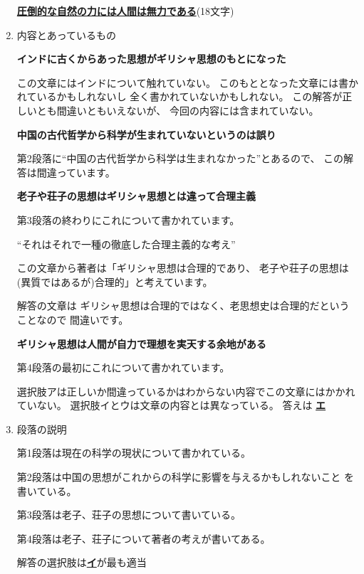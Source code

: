 \documentclass[10pt,b5paper]{ltjsarticle}
\begin{document}
\begin{enumerate}
       \underline{\textbf{圧倒的な自然の力には人間は無力である}}(18文字)

 \item 内容とあっているもの

       \textbf{インドに古くからあった思想がギリシャ思想のもとになった}

       この文章にはインドについて触れていない。
       このもととなった文章には書かれているかもしれないし
       全く書かれていないかもしれない。
       この解答が正しいとも間違いともいえないが、
       今回の内容には含まれていない。

       \textbf{中国の古代哲学から科学が生まれていないというのは誤り}

       第2段落に``中国の古代哲学から科学は生まれなかった''とあるので、
       この解答は間違っています。

       \textbf{老子や荘子の思想はギリシャ思想とは違って合理主義}

       第3段落の終わりにこれについて書かれています。

       ``それはそれで一種の徹底した合理主義的な考え''

       この文章から著者は「ギリシャ思想は合理的であり、
       老子や荘子の思想は(異質ではあるが)合理的」と考えています。

       解答の文章は
       ギリシャ思想は合理的ではなく、老思想史は合理的だということなので
       間違いです。

       \textbf{ギリシャ思想は人間が自力で理想を実天する余地がある}

       第4段落の最初にこれについて書かれています。

       選択肢アは正しいか間違っているかはわからない内容でこの文章にはかかれていない。
       選択肢イとウは文章の内容とは異なっている。
       答えは \underline{\textbf{エ}}

 \item 段落の説明

       第1段落は現在の科学の現状について書かれている。

       第2段落は中国の思想がこれからの科学に影響を与えるかもしれないこと
       を書いている。

       第3段落は老子、荘子の思想について書いている。

       第4段落は老子、荘子について著者の考えが書いてある。

       解答の選択肢は\underline{\textbf{イ}}が最も適当
\end{enumerate}
\end{document}
